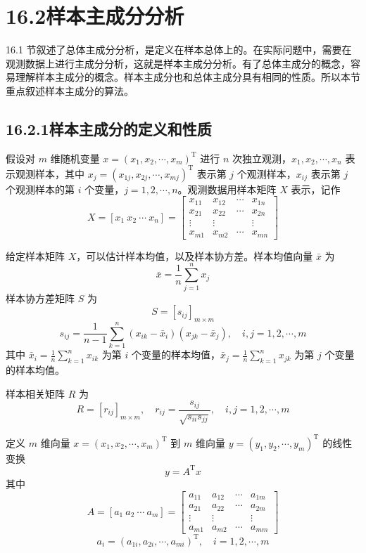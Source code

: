 \documentclass[UTF8,12pt,a4paper,fontset=fandol]{ctexart}
\begin{document}
\section*{16.2\quad 样本主成分分析}

16.1 节叙述了总体主成分分析，是定义在样本总体上的。在实际问题中，需要在观测数据上进行主成分分析，这就是样本主成分分析。有了总体主成分的概念，容易理解样本主成分的概念。样本主成分也和总体主成分具有相同的性质。所以本节重点叙述样本主成分的算法。

\subsection*{16.2.1\quad 样本主成分的定义和性质}

假设对 $m$ 维随机变量 $x=(x_1,x_2,\cdots,x_m)^{\mathrm{T}}$ 进行 $n$ 次独立观测，$x_1,x_2,\cdots,x_n$ 表示观测样本，其中 $x_j=(x_{1j},x_{2j},\cdots,x_{mj})^{\mathrm{T}}$ 表示第 $j$ 个观测样本，$x_{ij}$ 表示第 $j$ 个观测样本的第 $i$ 个变量，$j=1,2,\cdots,n$。观测数据用样本矩阵 $X$ 表示，记作
\begin{equation}
X=[x_1\ x_2\ \cdots\ x_n]=
\begin{bmatrix}
x_{11} & x_{12} & \cdots & x_{1n}\\
x_{21} & x_{22} & \cdots & x_{2n}\\
\vdots & \vdots & & \vdots\\
x_{m1} & x_{m2} & \cdots & x_{mn}
\end{bmatrix}
\tag{16.39}
\end{equation}

给定样本矩阵 $X$，可以估计样本均值，以及样本协方差。样本均值向量 $\bar x$ 为
\begin{equation}
\bar x=\frac{1}{n}\sum_{j=1}^n x_j
\tag{16.40}
\end{equation}
样本协方差矩阵 $S$ 为
\[
S=[s_{ij}]_{m\times m}
\]
\begin{equation}
s_{ij}=\frac{1}{n-1}\sum_{k=1}^n(x_{ik}-\bar x_i)(x_{jk}-\bar x_j),\quad i,j=1,2,\cdots,m
\tag{16.41}
\end{equation}
其中 $\bar x_i=\frac{1}{n}\sum_{k=1}^n x_{ik}$ 为第 $i$ 个变量的样本均值，$\bar x_j=\frac{1}{n}\sum_{k=1}^n x_{jk}$ 为第 $j$ 个变量的样本均值。

样本相关矩阵 $R$ 为
\begin{equation}
R=[r_{ij}]_{m\times m},\quad r_{ij}=\frac{s_{ij}}{\sqrt{s_{ii}s_{jj}}},\quad i,j=1,2,\cdots,m
\tag{16.42}
\end{equation}

定义 $m$ 维向量 $x=(x_1,x_2,\cdots,x_m)^{\mathrm{T}}$ 到 $m$ 维向量 $y=(y_1,y_2,\cdots,y_m)^{\mathrm{T}}$ 的线性变换
\begin{equation}
y=A^{\mathrm{T}}x
\tag{16.43}
\end{equation}
其中
\[
A=[a_1\ a_2\ \cdots\ a_m]=
\begin{bmatrix}
a_{11} & a_{12} & \cdots & a_{1m}\\
a_{21} & a_{22} & \cdots & a_{2m}\\
\vdots & \vdots & & \vdots\\
a_{m1} & a_{m2} & \cdots & a_{mm}
\end{bmatrix}
\]
\[
a_i=(a_{1i},a_{2i},\cdots,a_{mi})^{\mathrm{T}},\quad i=1,2,\cdots,m
\]
\end{document}
